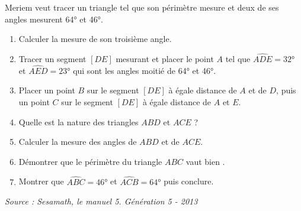 \begin{exercice*}
   Meriem veut tracer un triangle tel que son périmètre mesure  et deux de ses angles mesurent \ang{64} et \ang{46}.
   \begin{enumerate}
      \item Calculer la mesure de son troisième angle.
      \item Tracer un segment $[DE]$ mesurant  et placer le point $A$ tel que $\widehat{ADE} =\ang{32}$ et $\widehat{AED} =\ang{23}$ qui sont les angles moitié de \ang{64} et \ang{46}.
      \item Placer un point $B$ sur le segment $[DE]$ à égale distance de $A$ et de $D$, puis un point $C$ sur le segment $[DE]$ à égale distance de $A$ et $E$. 
      \item Quelle est la nature des triangles $ABD$ et $ACE$ ?
      \item Calculer la mesure des angles de $ABD$ et de $ACE$.
      \item Démontrer que le périmètre du triangle $ABC$ vaut bien .
      \item Montrer que $\widehat{ABC} =\ang{46}$ et $\widehat{ACB} =\ang{64}$ puis conclure.
   \end{enumerate}
   \hfill {\it\footnotesize Source : Sesamath, le manuel 5. Génération 5 - 2013}   
\end{exercice*}
